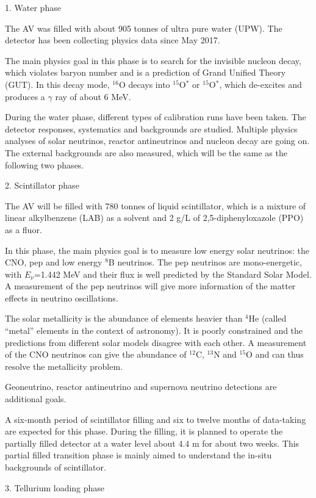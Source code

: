 1. Water phase 

The AV was filled with about 905 tonnes of ultra pure water (UPW). The detector has been collecting physics data since May 2017.

The main physics goal in this phase is to search for the invisible nucleon decay, which violates baryon number and is a prediction of Grand Unified Theory (GUT). In this decay mode, $^{16}$O decays into $^{15}$O$^*$ or $ ^{15}$O$^*$, which de-excites and produces a $\gamma$ ray of about 6 MeV.

During the water phase, different types of calibration runs have been taken. The detector responses, systematics and backgrounds are studied. Multiple physics analyses of solar neutrinos, reactor antineutrinos and nucleon decay are going on. The external backgrounds are also measured, which will be the same as the following two phases. 

2. Scintillator phase

The AV will be filled with 780 tonnes of liquid scintillator, which is a mixture of linear alkylbenzene (LAB) as a solvent and 2 g/L of 2,5-diphenyloxazole (PPO) as a fluor.

In this phase, the main physics goal is to measure low energy solar neutrinos: the CNO, pep and low energy $^8$B neutrinos. The pep neutrinos are mono-energetic, with $E_\nu$=1.442 MeV and their flux is well predicted by the Standard Solar Model. A measurement of the pep neutrinos will give more information of the matter effects in neutrino oscillations\cite{borexino}. 

The solar metallicity is the abundance of elements heavier than $^4$He (called ``metal'' elements in the context of astronomy). It is poorly constrained and the predictions from different solar models disagree with each other. A measurement of the CNO neutrinos can give the abundance of $^{12}$C, $^{13}$N and $^{15}$O and can thus resolve the metallicity problem\cite{cno}.

Geoneutrino, reactor antineutrino and supernova neutrino detections are additional goals.

A six-month period of scintillator filling and six to twelve months of data-taking are expected for this phase. During the filling, it is planned to operate the partially filled detector at a water level about 4.4 m for about two weeks. This partial filled transition phase is mainly aimed to understand the in-situ backgrounds of scintillator. 

3. Tellurium loading phase

